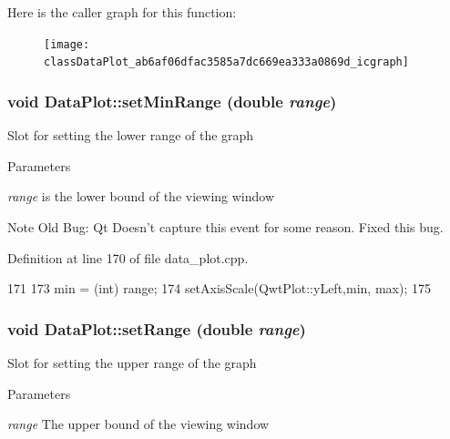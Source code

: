 Here is the caller graph for this function:\nopagebreak
\begin{figure}[H]
\begin{center}
\leavevmode
\texttt{[image: classDataPlot\_ab6af06dfac3585a7dc669ea333a0869d\_icgraph]}
\end{center}
\end{figure}


\hypertarget{classDataPlot_ad101ac80563ee10322788946d791ea09}{
\subsubsection[{setMinRange}]{\setlength{\rightskip}{0pt plus 5cm}void DataPlot::setMinRange (double {\em range})}}
\label{classDataPlot_ad101ac80563ee10322788946d791ea09}
Slot for setting the lower range of the graph 
\begin{DoxyParams}{Parameters}
\item[{\em range}]is the lower bound of the viewing window \end{DoxyParams}


\begin{DoxyNote}{Note}
Old Bug: Qt Doesn't capture this event for some reason. Fixed this bug. 
\end{DoxyNote}




Definition at line 170 of file data\_\-plot.cpp.




\begin{DoxyCode}
171 {
173     min = (int) range;
174     setAxisScale(QwtPlot::yLeft,min, max);
175 }
\end{DoxyCode}


\hypertarget{classDataPlot_a642185fdad89b1b075bc00670242fa0b}{
\subsubsection[{setRange}]{\setlength{\rightskip}{0pt plus 5cm}void DataPlot::setRange (double {\em range})}}
\label{classDataPlot_a642185fdad89b1b075bc00670242fa0b}
Slot for setting the upper range of the graph 
\begin{DoxyParams}{Parameters}
\item[{\em range}]The upper bound of the viewing window \end{DoxyParams}


